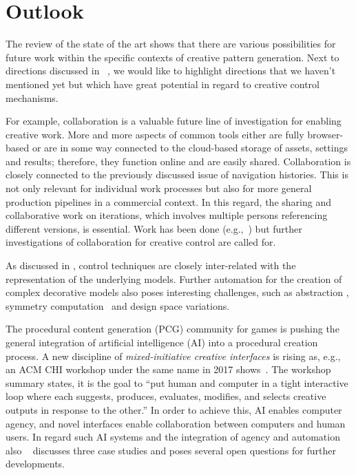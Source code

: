 
\section{Outlook}
\label{sec:outlook}

The review of the state of the art shows that there are various possibilities for future work within the specific contexts of creative pattern generation. Next to directions discussed in ~, we would like to highlight directions that we haven't mentioned yet but which have great potential in regard to creative control mechanisms.

For example, collaboration is a valuable future line of investigation for enabling creative work. More and more aspects of common tools either are fully browser-based or are in some way connected to the cloud-based storage of assets, settings and results; therefore, they function online and are easily shared. Collaboration is closely connected to the previously discussed issue of navigation histories. This is not only relevant for individual work processes but also for more general production pipelines in a commercial context. In this regard, the sharing and collaborative work on iterations, which involves multiple persons referencing different versions, is essential. Work has been done (e.g.,~\cite{talton_2009_emw, salvati_2015_mcm,oleary_2018_csi}) but further investigations of collaboration for creative control are called for. 

As discussed in , control techniques are closely inter-related with the representation of the underlying models. 
Further automation for the creation of complex decorative models also poses interesting challenges, such as abstraction \cite{nan_2011_cgr}, symmetry computation~\cite{cullen_2011_sh} and design space variations.

The procedural content generation (PCG) community for games is pushing the general integration of artificial intelligence (AI) into a procedural creation process. A new discipline of \textit{mixed-initiative creative interfaces} is rising as, e.g., an ACM CHI workshop under the same name in 2017 shows~\cite{deterding_2017_mci}. The workshop summary states, it is the goal to ``put human and computer in a tight interactive loop where each suggests, produces, evaluates, modifies, and selects creative outputs in response to the other.'' In order to achieve this, AI enables computer agency, and novel interfaces enable collaboration between computers and human users. In regard such AI systems and the integration of agency and automation also \citeauthor*{heer_2019_apa}~\cite{heer_2019_apa} discusses three case studies and poses several open questions for further developments.

